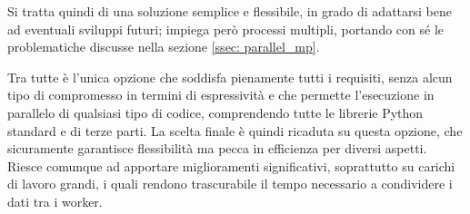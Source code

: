 Si tratta quindi di una soluzione semplice e flessibile, in grado di adattarsi
bene ad eventuali sviluppi futuri; impiega però processi multipli, portando con
sé le problematiche discusse nella sezione \ref{ssec: parallel_mp}.

Tra tutte è l'unica opzione che soddisfa pienamente tutti i requisiti, senza
alcun tipo di compromesso in termini di espressività e che permette l'esecuzione
in parallelo di qualsiasi tipo di codice, comprendendo tutte le librerie Python
standard e di terze parti. La scelta finale è quindi ricaduta su questa opzione,
che sicuramente garantisce flessibilità ma pecca in efficienza per diversi
aspetti. Riesce comunque ad apportare miglioramenti significativi, soprattutto
su carichi di lavoro grandi, i quali rendono trascurabile il tempo necessario a
condividere i dati tra i worker.